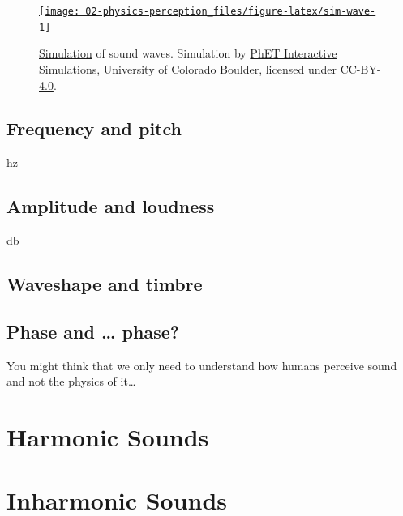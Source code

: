 \documentclass[
]{book}
\begin{document}
\begin{figure}
\href{https://phet.colorado.edu/sims/html/waves-intro/latest/waves-intro_en.html?screens=2}{\texttt{[image: 02-physics-perception\_files/figure-latex/sim-wave-1]} }\caption{\href{https://phet.colorado.edu/sims/html/waves-intro/latest/waves-intro_en.html?screens=2}{Simulation} of sound waves. Simulation by \href{https://phet.colorado.edu/}{PhET Interactive Simulations}, University of Colorado Boulder, licensed under \href{https://creativecommons.org/licenses/by/4.0/}{CC-BY-4.0}.}\label{fig:sim-wave}
\end{figure}

\hypertarget{frequency-and-pitch}{%
\section{Frequency and pitch}\label{frequency-and-pitch}}

hz

\hypertarget{amplitude-and-loudness}{%
\section{Amplitude and loudness}\label{amplitude-and-loudness}}

db

\hypertarget{waveshape-and-timbre}{%
\section{Waveshape and timbre}\label{waveshape-and-timbre}}

\hypertarget{phase-and-phase}{%
\section{Phase and \ldots{} phase?}\label{phase-and-phase}}

You might think that we only need to understand how humans perceive sound and not the physics of it\ldots{}

\hypertarget{harmonic-sounds}{%
\chapter{Harmonic Sounds}\label{harmonic-sounds}}

\hypertarget{inharmonic-sounds}{%
\chapter{Inharmonic Sounds}\label{inharmonic-sounds}}
\end{document}
